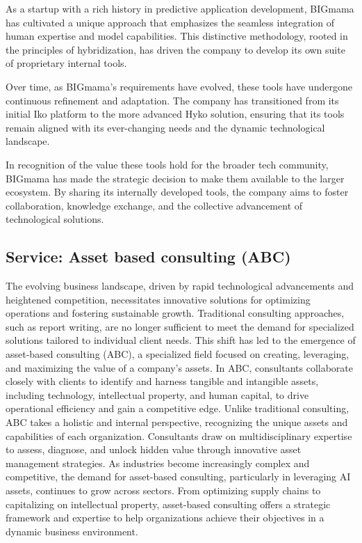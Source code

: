 As a startup with a rich history in predictive application development, BIGmama has cultivated a unique approach that emphasizes the seamless integration of human expertise and model capabilities. This distinctive methodology, rooted in the principles of hybridization, has driven the company to develop its own suite of proprietary internal tools.

Over time, as BIGmama's requirements have evolved, these tools have undergone continuous refinement and adaptation. The company has transitioned from its initial Iko platform to the more advanced Hyko solution, ensuring that its tools remain aligned with its ever-changing needs and the dynamic technological landscape.

In recognition of the value these tools hold for the broader tech community, BIGmama has made the strategic decision to make them available to the larger ecosystem. By sharing its internally developed tools, the company aims to foster collaboration, knowledge exchange, and the collective advancement of technological solutions.


\subsection{Service: Asset based consulting (ABC)}

The evolving business landscape, driven by rapid technological advancements and heightened competition, necessitates innovative solutions for optimizing operations and fostering sustainable growth. Traditional consulting approaches, such as report writing, are no longer sufficient to meet the demand for specialized solutions tailored to individual client needs. This shift has led to the emergence of asset-based consulting (ABC), a specialized field focused on creating, leveraging, and maximizing the value of a company's assets. In ABC, consultants collaborate closely with clients to identify and harness tangible and intangible assets, including technology, intellectual property, and human capital, to drive operational efficiency and gain a competitive edge. Unlike traditional consulting, ABC takes a holistic and internal perspective, recognizing the unique assets and capabilities of each organization. Consultants draw on multidisciplinary expertise to assess, diagnose, and unlock hidden value through innovative asset management strategies. As industries become increasingly complex and competitive, the demand for asset-based consulting, particularly in leveraging AI assets, continues to grow across sectors. From optimizing supply chains to capitalizing on intellectual property, asset-based consulting offers a strategic framework and expertise to help organizations achieve their objectives in a dynamic business environment.

